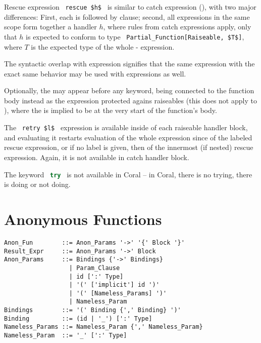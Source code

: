 Rescue expression ~\lstinline!rescue $h$!~ is similar to catch expression (), with two major differences: First, each  is followed by  clause; second, all  expressions in the same scope form together a handler $h$, where rules from catch expressions apply, only that $h$ is expected to conform to type ~\lstinline!Partial_Function[Raiseable, $T$]!, where $T$ is the expected type of the whole - expression. 

The syntactic overlap with  expression signifies that the same expression with the exact same behavior may be used with  expressions as well. 

Optionally, the  may appear before any  keyword, being connected to the function body instead as the expression protected agains raiseables (this does not apply to ), where the  is implied to be at the very start of the function's body. 

The ~\lstinline!retry $l$!~ expression is available inside of each raiseable handler block, and evaluating it restarts evaluation of the whole expression since  of the labeled rescue expression, or if no label is given, then of the innermost (if nested) rescue expression. Again, it is not available in catch handler block. 

The keyword ~\lstinline[language=Java]!try!~ is not available in Coral -- in Coral, there is no trying, there is doing or not doing.  





\section{Anonymous Functions}
\label{sec:anonymous-functions}

\syntax\begin{lstlisting}
Anon_Fun        ::= Anon_Params '->' '{' Block '}'
Result_Expr     ::= Anon_Params '->' Block 
Anon_Params     ::= Bindings {'->' Bindings}
                  | Param_Clause
                  | id [':' Type]
                  | '(' ['implicit'] id ')'
                  | '(' [Nameless_Params] ')'
                  | Nameless_Param
Bindings        ::= '(' Binding {',' Binding} ')'
Binding         ::= (id | '_') [':' Type]
Nameless_Params ::= Nameless_Param {',' Nameless_Param}
Nameless_Param  ::= '_' [':' Type]
\end{lstlisting}

